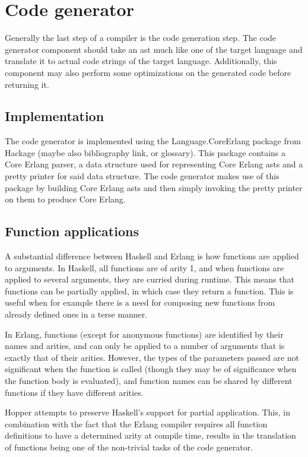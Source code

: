 \section{Code generator}

Generally the last step of a compiler is the code generation step. The code generator
component should take an \gls{ast} much like one of the target language and translate it
to actual code strings of the target language. Additionally, this component may also
perform some optimizations on the generated code before returning it.

\subsection{Implementation}

The code generator is implemented using the Language.CoreErlang \cite{CoreErlang} package
from Hackage (maybe also bibliography link, or glossary). This package contains a Core Erlang
parser, a data structure used for representing Core Erlang \gls{ast}s and a pretty printer for
said data structure. The code generator makes use of this package by building Core Erlang
\gls{ast}s and then simply invoking the pretty printer on them to  produce Core Erlang.

\subsection{Function applications}

A substantial difference between Haskell and Erlang is how functions are applied to arguments. 
In Haskell, all functions are of arity 1, and when functions are applied to several arguments, they are curried during runtime. This means that functions can be partially applied, in which case they return a function. This is useful when for example there is a need for composing new functions from already defined ones in a terse manner.

In Erlang, functions (except for anonymous functions) are identified by their names and arities, and can only be applied to a number of arguments that is exactly that of their arities. However, the types of the parameters passed are not significant when the function is called (though they may be of significance when the function body is evaluated), and function names can be shared by different functions if they have different arities.

Hopper attempts to preserve Haskell's support for partial application. This, in combination with the fact that the Erlang compiler requires all function definitions to have a determined arity at compile time, results in the translation of functions being one of the non-trivial tasks of the code generator.

